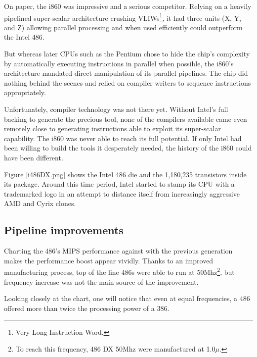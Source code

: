 On paper, the i860 was impressive and a serious competitor. Relying on a heavily pipelined super-scalar architecture crushing VLIWs\footnote{Very Long Instruction Word.}, it had three units (X, Y, and Z) allowing parallel processing and when used efficiently could outperform the Intel 486.\\
\par
But whereas later CPUs such as the Pentium chose to hide the chip's complexity by automatically executing instructions in parallel when possible, the i860's architecture mandated direct manipulation of its parallel pipelines. The chip did nothing behind the scenes and relied on compiler writers to sequence instructions appropriately.\\
\par
Unfortunately, compiler technology was not there yet. Without Intel's full backing to generate the precious tool, none of the compilers available came even remotely close to generating instructions able to exploit its super-scalar capability. The i860 was never able to reach its full potential. If only Intel had been willing to build the tools it desperately needed, the history of the i860 could have been different.\\
\par
\par
{}
\par
Figure \ref{i486DX.png} shows the Intel 486 die and the 1,180,235 transistors inside its package. Around this time period, Intel started to stamp its CPU with a trademarked logo in an attempt to distance itself from increasingly aggressive AMD and Cyrix clones.\\
\par
{}

\par
\subsection{Pipeline improvements}
Charting the 486's MIPS performance against with the previous generation makes the performance boost appear vividly. Thanks to an improved manufacturing process, top of the line 486s were able to run at 50Mhz\footnote{To reach this frequency, 486 DX 50Mhz were manufactured at 1.0$\mu$.}, but frequency increase was not the main source of the improvement.\\
\par
 Looking closely at the chart, one will notice that even at equal frequencies, a 486 offered more than twice the processing power of a 386.\\

